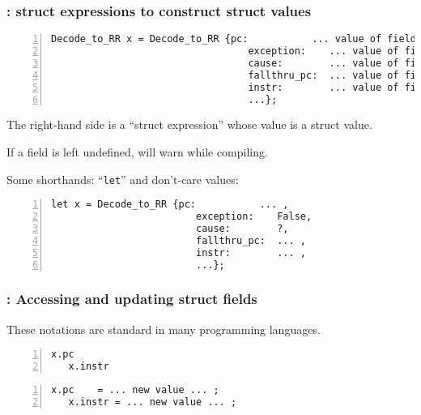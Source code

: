 \begin{frame}[fragile]
\frametitle{{\BSV}: struct expressions to construct struct values}

\footnotesize

\begin{Verbatim}[frame=single, numbers=left]
   Decode_to_RR x = Decode_to_RR {pc:           ... value of field ... ,
                                  exception:    ... value of field ... ,
                                  cause:        ... value of field ... ,
                                  fallthru_pc:  ... value of field ... ,
                                  instr:        ... value of field ... ,
                                  ...};
\end{Verbatim}
The right-hand side is a ``struct expression'' whose value is a struct value.

\vspace{1ex}

If a field is left undefined, {\bsc} will warn while compiling.

\PAUSE{\vspace*{4ex}}

Some shorthands: ``{\tt let}'' and don't-care values:

\PAUSE{\vspace*{2ex}}

\begin{Verbatim}[frame=single, numbers=left]
   let x = Decode_to_RR {pc:           ... ,
                         exception:    False,
                         cause:        ?,
                         fallthru_pc:  ... ,
                         instr:        ... ,
                         ...};
\end{Verbatim}

\end{frame}


\begin{frame}[fragile]
\frametitle{{\BSV}: Accessing and updating struct fields}

\footnotesize

These notations are standard in many programming languages.

\vspace{5ex}

\begin{Verbatim}[frame=single, numbers=left]
   x.pc
   x.instr
\end{Verbatim}

\vspace{5ex}

\begin{Verbatim}[frame=single, numbers=left]
   x.pc    = ... new value ... ;
   x.instr = ... new value ... ;
\end{Verbatim}

\end{frame}

